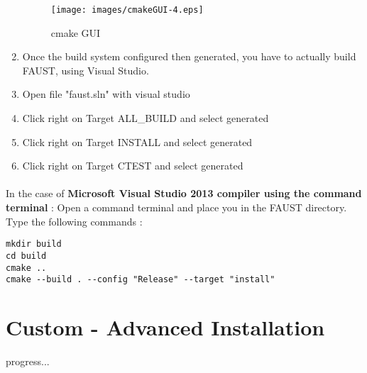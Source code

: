\begin{enumerate}
\begin{figure}[!h] %
\centering
\texttt{[image: images/cmakeGUI-4.eps]}
\caption{cmake GUI}
\label{fig:cmakeGUI-4}
\end{figure}

\item Once the build system configured then generated, you have to actually build FAUST, using Visual Studio.
\item Open file "faust.sln" with visual studio 
\item Click right on Target ALL\_BUILD and select generated 
\item Click right on Target INSTALL and select generated 
\item Click right on Target CTEST and select generated 
\end{enumerate}



\paragraph{}In the case of \textbf{Microsoft Visual Studio 2013 compiler using the command terminal} :
Open a command terminal and place you in the FAUST directory. Type the following commands : 
\begin{lstlisting}
mkdir build
cd build
cmake .. 
cmake --build . --config "Release" --target "install"
\end{lstlisting}


\section{Custom - Advanced Installation}\label{sec:WinCustomInstall}

progress... 



